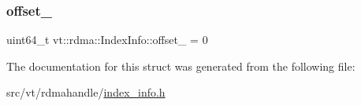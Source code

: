 \mbox{\label{structvt_1_1rdma_1_1_index_info_ac60334cf8ad727810eeaa7163582aded}} 
\subsubsection{\texorpdfstring{offset\+\_\+}{offset\_}}
{\footnotesize\ttfamily uint64\+\_\+t vt\+::rdma\+::\+Index\+Info\+::offset\+\_\+ = 0\hspace{0.3cm}{\ttfamily [private]}}



The documentation for this struct was generated from the following file\+:\begin{DoxyCompactItemize}
\item 
src/vt/rdmahandle/\hyperlink{index__info_8h}{index\+\_\+info.\+h}\end{DoxyCompactItemize}
